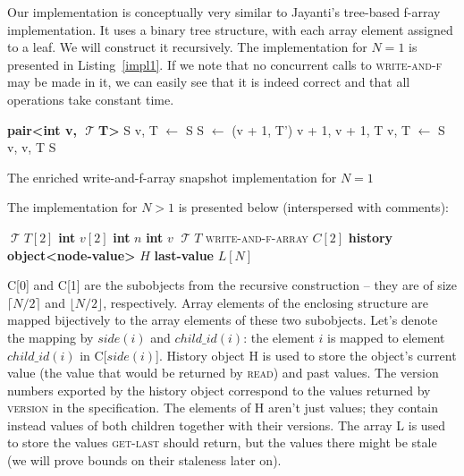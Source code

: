 \documentclass[a4paper,11pt]{article}
\def\T{\ensuremath{\operatorname{\mathcal{T}}}\text{ }}
\newcommand{\fn}[1]{\textsc{#1}}
\begin{document}
Our implementation is conceptually very similar to Jayanti's tree-based f-array implementation. It uses a binary tree structure, with each array element assigned to a leaf.
We will construct it recursively. The implementation for $N = 1$ is presented in Listing~\ref{impl1}. If we note that no concurrent calls to \fn{write-and-f} may be made in it, we can easily
see that it is indeed correct and that all operations take constant time.

\begin{Listing}[!h]
\begin{algorithmic}[1]
	\State \textbf{pair<int v, \T T>} S
		\State v, T $\gets$ S
		\State S $\gets$ (v + 1, T')
		\State \Return v + 1, v + 1, T
	\EndFunction
		\State v, T $\gets$ S
		\State \Return v, v, T
	\EndFunction
		\State \Return S
	\EndFunction
\end{algorithmic}
\caption{The enriched write-and-f-array snapshot implementation for $N=1$}
\label{impl1}
\end{Listing}
\FloatBarrier

The implementation for $N > 1$ is presented below (interspersed with comments):
\begin{algorithmic}[1]
		\State \T $T[2]$ 
		\State \textbf{int} $v[2]$ 
	\EndStruct
		\State \textbf{int} $n$
		\State \textbf{int} $v$
		\State \T $T$
	\EndStruct
	\State \textsc{write-and-f-array} $C[2]$ 
	\State \textbf{history object<node-value>} $H$ 
	\State \textbf{last-value} $L[N]$ %
\end{algorithmic}

C[0] and C[1] are the subobjects from the recursive construction -- they are of size $\lceil{}N/2\rceil{}$ and $\lfloor{}N/2\rfloor{}$, respectively. Array elements of the enclosing
structure are mapped bijectively to the array elements of these two subobjects. Let's denote the mapping by $side(i)$ and $child\_id(i)$: the element $i$ is mapped to element $child\_id(i)$ in C[$side(i)$].
History object H is used to store the object's current value (the value that would be returned by \fn{read}) and past values. The version numbers exported by the history object correspond to the values returned by \fn{version}
in the specification. The elements of H aren't just values; they contain instead values of both children together with their versions.
The array L is used to store the values \fn{get-last} should return, but the values there might be stale (we will prove bounds on their staleness later on).
\end{document}
